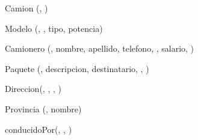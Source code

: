 Camion	(, )

Modelo (, , tipo, potencia)

Camionero	(, nombre, apellido, telefono, , salario, )

Paquete	(, descripcion, destinatario, , )

Direccion(, , , )

Provincia (, nombre)

conducidoPor(, , )


